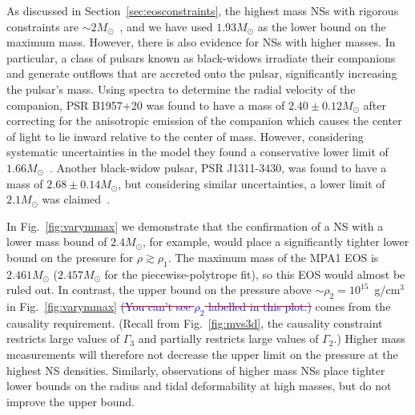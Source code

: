 \documentclass[twocolumn,prd,amssymb,aps,nofootinbib,showpacs,epsf]{revtex4}
\newcommand\ben[2]{\textcolor{red}{{#1}\sout{#2}}}
\newcommand\les[2]{\textcolor{blue}{{#1}\sout{#2}}}
\begin{document}
As discussed in Section~\ref{sec:eosconstraints}, the highest mass NSs with rigorous constraints are $\sim 2M_\odot$~\cite{DemorestPennucciRansom2010, AntoniadisFreireWex2013}, and we have used $1.93M_\odot$ as the lower bound on the maximum mass. However, there is also evidence for NSs with higher masses. In particular, a class of pulsars known as black-widows irradiate their companions and generate outflows that are accreted onto the pulsar, significantly increasing the pulsar's mass. Using spectra to determine the radial velocity of the companion, PSR B1957+20 was found to have a mass of $2.40\pm0.12M_\odot$ after correcting for the anisotropic emission of the companion which causes the center of light to lie inward relative to the center of mass. However, considering systematic uncertainties in the model they found a conservative lower limit of $1.66M_\odot$~\cite{VanKerkwijkBretonKulkarni2011}. Another black-widow pulsar, PSR J1311-3430, was found to have a mass of $2.68\pm0.14M_\odot$, but considering similar uncertainties, a lower limit of $2.1M_\odot$ was claimed~\cite{RomaniFilippenkoSilverman2012}. 

In Fig.~\ref{fig:varymmax} we demonstrate that the confirmation of a NS with a lower mass bound of $2.4M_\odot$, for example, would place a significantly tighter lower bound on the pressure for $\rho \gtrsim \rho_1$. The maximum mass of the MPA1 EOS is $2.461M_\odot$ ($2.457M_\odot$ for the piecewise-polytrope fit), so this EOS would almost be ruled out. In contrast, the upper bound on the pressure above $\sim\rho_2=10^{15}$~g/cm$^3$ in Fig.~\ref{fig:varymmax} \ben{}{\les{(You can't see $\rho_2$ labelled in this plot.)}{}} comes from the causality requirement. (Recall from Fig.~\ref{fig:mvs3d}, the causality constraint restricts large values of $\Gamma_3$ and partially restricts large values of $\Gamma_2$.) Higher mass measurements will therefore not decrease the upper limit on the pressure at the highest NS densities. Similarly, observations of higher mass NSs place tighter lower bounds on the radius and tidal deformability at high masses, but do not improve the upper bound.
\end{document}
